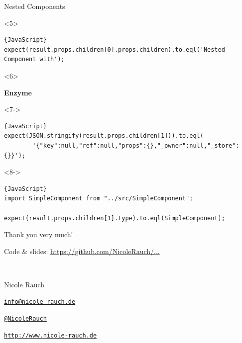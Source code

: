 \begin{frame}[fragile]{Nested Components}
\begin{overlayarea}{\linewidth}{3cm}
\begin{onlyenv}<5>
\vspace{-0.5em}
\begin{lstlisting}{JavaScript}
expect(result.props.children[0].props.children).to.eql('Nested Component with');
\end{lstlisting}
\end{onlyenv}

\begin{onlyenv}<6>
\vspace{-0.5em}
\begin{center}

\textcolor{airbnb}{\textbf{\LARGE Enzyme}}
\end{center}
\end{onlyenv}

\begin{onlyenv}<7->
\vspace{-0.5em}
\begin{lstlisting}{JavaScript}
expect(JSON.stringify(result.props.children[1])).to.eql(
        '{"key":null,"ref":null,"props":{},"_owner":null,"_store":{}}');
\end{lstlisting}
\end{onlyenv}

\begin{onlyenv}<8->
\vspace{-0.5em}
\begin{lstlisting}{JavaScript}
import SimpleComponent from "../src/SimpleComponent";

expect(result.props.children[1].type).to.eql(SimpleComponent);
\end{lstlisting}
\end{onlyenv}

\end{overlayarea}


\end{frame}


\begin{frame}{Thank you very much!}

        Code \& slides: \url{https://github.com/NicoleRauch/...}
        
        ~\\[1em]
        \begin{block}{Nicole Rauch}
        \begin{description}[Twitterxx]
                \item[E-Mail]  \href{mailto:info@nicole-rauch.de}{\texttt{info@nicole-rauch.de}}
                \item[Twitter] \href{http://twitter.com/NicoleRauch}{\texttt{@NicoleRauch}}
                \item[Web] \href{http://www.nicole-rauch.de}{\texttt{http://www.nicole-rauch.de}}
        \end{description}
        \end{block}
\end{frame}

